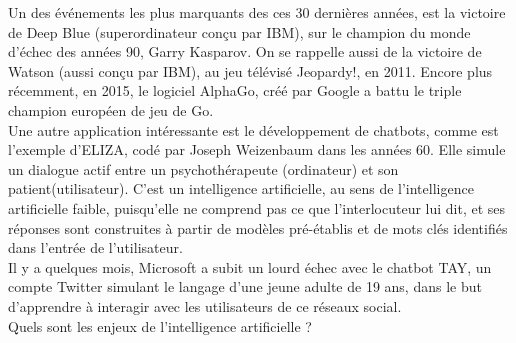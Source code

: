 \documentclass[a4paper,12pt]{report}
\begin{document}
Un des événements les plus marquants des ces 30 dernières années, est la victoire de Deep Blue (superordinateur conçu par IBM), sur le champion du monde d'échec des années 90, Garry Kasparov. On se rappelle aussi de la victoire de Watson (aussi conçu par IBM), au jeu télévisé Jeopardy!, en 2011. Encore plus récemment, en 2015, le logiciel AlphaGo, créé par Google a battu le triple champion européen de jeu de Go.
\\
Une autre application intéressante est le développement de chatbots, comme est l'exemple d'ELIZA, codé par Joseph Weizenbaum dans les années 60. Elle simule un dialogue actif entre un psychothérapeute (ordinateur) et son patient(utilisateur). C'est un intelligence artificielle, au sens de l'intelligence artificielle faible, puisqu'elle ne comprend pas ce que l'interlocuteur lui dit, et ses réponses sont construites à partir de modèles pré-établis et de mots clés identifiés dans l'entrée de l'utilisateur.
\\
Il y a quelques mois, Microsoft a subit un lourd échec avec le chatbot TAY, un compte Twitter simulant le langage d'une jeune adulte de 19 ans, dans le but d'apprendre à interagir avec les utilisateurs de ce réseaux social. \\
Quels sont les enjeux de l'intelligence artificielle ? 
\end{document}

